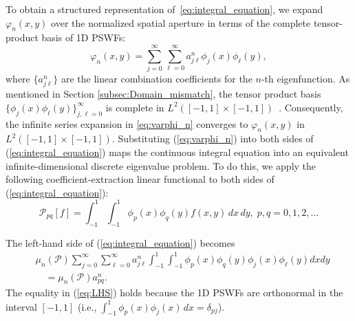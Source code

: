 \documentclass[lettersize,journal]{IEEEtran}
\theoremstyle{plain}
\begin{document}
To obtain a structured representation of~\eqref{eq:integral_equation}, we expand $\varphi_n(x,y)$ over the normalized spatial aperture in terms of the complete tensor-product basis
of 1D PSWFs:
\begin{equation}
	\varphi_n(x, y) = \sum_{j=0}^{\infty}\sum_{\ell=0}^{\infty}a_{j\ell}^n\phi_j(x)\phi_\ell(y),
	\label{eq:varphi_n}
\end{equation}
where $\{a_{j\ell}^n\}$ are the linear combination coefficients for the $n$-th eigenfunction. 
As mentioned in Section \ref{subsec:Domain_mismatch}, the tensor product basis $\{\phi_j(x)\phi_\ell(y)\}_{j,\ell=0}^{\infty}$ is complete in $L^2([-1, 1]\times [-1, 1])$~\cite[Chapter II.4]{reed1980methods}. Consequently, the infinite series expansion in \eqref{eq:varphi_n} converges to $\varphi_n(x, y)$ in $L^2([-1, 1]\times[-1, 1])$.
Substituting (\ref{eq:varphi_n}) into both sides of (\ref{eq:integral_equation}) maps the continuous integral equation into an equivalent infinite-dimensional discrete eigenvalue problem. To do this, we apply the following coefficient-extraction linear functional to both sides of (\ref{eq:integral_equation}):
$$
	\mathcal{P}_{pq}[f] = \int_{-1}^{1}\int_{-1}^{1}\phi_p(x)\phi_q(y)f(x, y)\,dx\,dy, \; p, q = 0, 1, 2, \ldots
	\label{eq:projection_operator}
$$
	
The left-hand side of (\ref{eq:integral_equation}) becomes
\begin{align}
	&\mu_n(\mathcal{P})\sum_{j=0}^{\infty}\sum_{\ell=0}^{\infty}a_{j\ell}^n\int_{-1}^{1}\int_{-1}^ {1}\phi_p(x)\phi_q(y)\phi_j(x)\phi_\ell(y)dxdy \nonumber \\
	&\quad = \mu_n(\mathcal{P})a_{pq}^n.
	\label{eq:LHS}
\end{align}
The equality in (\ref{eq:LHS}) holds because the 1D PSWFs are orthonormal in the interval $[-1, 1]$ (i.e., $\int_{-1}^{1}\phi_p(x)\phi_j(x)\,dx = \delta_{pj}$). 
	
\end{document}
